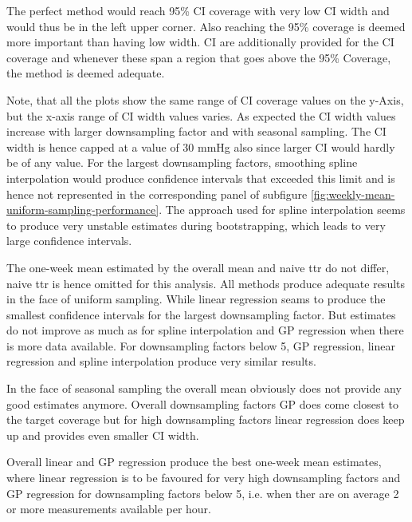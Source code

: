 The perfect method would reach 95\% CI coverage with very
low CI width and would thus be in the left upper corner.
Also reaching the 95\% coverage is deemed more important
than having low width.
CI are additionally provided for the CI coverage and whenever these
span a region that goes above the 95\% Coverage, the method is deemed adequate.


Note, that all the plots show the same range of CI coverage values on
the y-Axis, but the x-axis range of CI width values varies.
As expected the CI width values increase with larger downsampling factor
and with seasonal sampling. The CI width is hence capped at a value of 30 mmHg also since 
larger CI would hardly be of any value.
For the largest downsampling factors, smoothing spline interpolation would produce confidence
intervals that exceeded this limit and is hence not represented in the corresponding
panel of subfigure \ref{fig:weekly-mean-uniform-sampling-performance}.
The approach used for spline interpolation seems to produce very
unstable estimates during bootstrapping, which leads to very large confidence intervals.

The one-week mean estimated by the overall mean and naive ttr do not differ,
naive ttr is hence omitted for this analysis.
All methods produce adequate results in the face of uniform sampling.
While linear regression seams to produce the smallest confidence intervals 
for the largest downsampling factor. 
But estimates do not improve as much as for 
spline interpolation and GP regression when there is more data available.
For downsampling factors below 5, GP regression, linear regression
and spline interpolation produce very similar results.

In the face of seasonal sampling
the overall mean obviously does not provide any good estimates anymore.
Overall downsampling factors GP does come closest
to the target coverage but for high downsampling factors linear regression
does keep up and provides even smaller CI width.

Overall linear and GP regression produce the best one-week mean estimates, where
linear regression is to be favoured for very high downsampling factors and
GP regression for downsampling factors below 5, i.e. when ther are on average
2 or more measurements available per hour.

